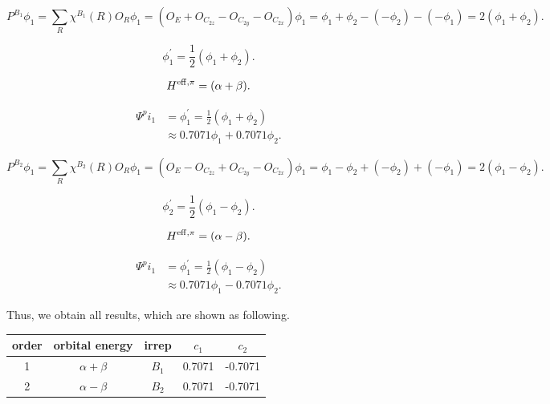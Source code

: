 		\begin{equation*}
		P^{B_1}\phi_1 = \sum_{R} \chi^{B_1}(R) O_R \phi_1 = (O_E + O_{C_{2z}} - O_{C_{2y}} - O_{C_{2x}})\phi_1 = \phi_1 +\phi_2 - (-\phi_2) - (-\phi_1) = 2(\phi_1 + \phi_2) .
		\end{equation*}
		
		\begin{equation*}
		\phi^\prime_1 = \frac{1}{2}(\phi_1 + \phi_2) .
		\end{equation*}
		
		\begin{equation*}
			H^{\rm eff,\pi} = ( \alpha + \beta ).
		\end{equation*}
		
		\begin{align}
			\Psi^pi_1 &= \phi^\prime_1 = \frac{1}{2}(\phi_1 + \phi_2) \\
			&\approx 0.7071 \phi_1 + 0.7071 \phi_2.
		\end{align}
		
		
		\begin{equation*}
		P^{B_2}\phi_1 = \sum_{R} \chi^{B_2}(R) O_R \phi_1 = (O_E - O_{C_{2z}} + O_{C_{2y}} - O_{C_{2x}})\phi_1 = \phi_1 - \phi_2 + (-\phi_2) + (-\phi_1) = 2(\phi_1 - \phi_2) .
		\end{equation*}
		
		\begin{equation*}
		\phi^\prime_2 = \frac{1}{2}(\phi_1 - \phi_2) .
		\end{equation*}
		
		\begin{equation*}
			H^{\rm eff,\pi} = ( \alpha - \beta ).
		\end{equation*}
		
		\begin{align}
			\Psi^pi_1 &= \phi^\prime_1 = \frac{1}{2}(\phi_1 - \phi_2) \\
			&\approx 0.7071 \phi_1 - 0.7071 \phi_2.
		\end{align}
		
		Thus, we obtain all results, which are shown as following.
		
		\begin{center}
		\begin{tabular}{ccccc}\hline
		order 	& orbital energy & irrep & $c_1$ & $c_2$ \\ \hline
			1	&	$\alpha+\beta$	&	$B_1$	&	0.7071	&	-0.7071	\\
			2	&	$\alpha-\beta$	&	$B_2$	&	0.7071	&	-0.7071	\\ \hline
		\end{tabular}
		\end{center}
		
